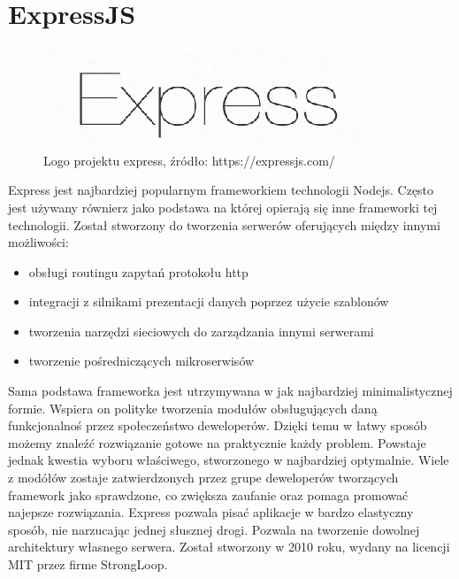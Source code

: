 \documentclass[12pt]{report}
\begin{document}
  \section{ExpressJS}
    \begin{figure}[!hb]
      \centering
      \includegraphics[width=\textwidth,height=\textheight,keepaspectratio]{logo_express.png} 
      \caption{Logo projektu express, źródło: https://expressjs.com/}
    \end{figure}
    Express jest najbardziej popularnym frameworkiem technologii Nodejs.
    Często jest używany równierz jako podstawa na której opierają się inne frameworki tej technologii.
    Został stworzony do tworzenia serwerów oferujących między innymi możliwości:
    \begin{itemize}
      \item obsługi routingu zapytań protokołu http
      \item integracji z silnikami prezentacji danych poprzez użycie szablonów
      \item tworzenia narzędzi sieciowych do zarządzania innymi serwerami
      \item tworzenie pośredniczących mikroserwisów
    \end{itemize} 
    Sama podstawa frameworka jest utrzymywana w jak najbardziej minimalistycznej formie.
    Wspiera on polityke tworzenia modułów obsługujących daną funkcjonalnoś przez społeczeństwo deweloperów.
    Dzięki temu w łatwy sposób możemy znaleźć rozwiązanie gotowe na praktycznie każdy problem.
    Powstaje jednak kwestia wyboru właściwego, stworzonego w najbardziej optymalnie.
    Wiele z modółów zostaje zatwierdzonych przez grupe deweloperów tworzących framework jako sprawdzone, co zwiększa zaufanie oraz pomaga promować najepsze rozwiązania.
    Express pozwala pisać aplikacje w bardzo elastyczny sposób, nie narzucając jednej słusznej drogi.
    Pozwala na tworzenie dowolnej architektury własnego serwera.
    Został stworzony w 2010 roku, wydany na licencji MIT przez firme StrongLoop.
\end{document}

